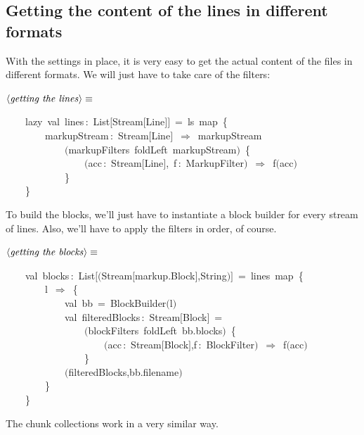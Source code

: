 \documentclass[a4paper,12pt]{article}
\begin{document}
\subsection{Getting the content of the lines in different formats}
With the settings in place, it is very easy to get the actual content
of the files in different formats. We will just have to take care of the
filters:

$\left<\mbox{\emph{getting the lines}}\right>\equiv$
\begin{program}~~~~{\vem lazy}~{\vem val}~lines\,{\rm :}~List$[$Stream$[$Line$]$$]$~=~ls~map~{\small\{}
\\~~~~~~~~markupStream\,{\rm :}~Stream$[$Line$]$~$\Rightarrow$~markupStream
\\~~~~~~~~~~~~$($markupFilters~foldLeft~markupStream$)$~{\small\{}
\\~~~~~~~~~~~~~~~~$($acc\,{\rm :}~Stream$[$Line$]$,~f\,{\rm :}~MarkupFilter$)$~$\Rightarrow$~f$($acc$)$
\\~~~~~~~~~~~~{\small\}}
\\~~~~{\small\}}
\\[0.5em]\end{program}
To build the blocks, we'll just have to instantiate a block builder
for every stream of lines. Also, we'll have to apply the filters in order,
of course.

$\left<\mbox{\emph{getting the blocks}}\right>\equiv$
\begin{program}~~~~{\vem val}~blocks\,{\rm :}~List$[$$($Stream$[$markup.Block$]$,String$)$$]$~=~lines~map~{\small\{}
\\~~~~~~~~l~$\Rightarrow$~{\small\{}
\\~~~~~~~~~~~~{\vem val}~bb~=~BlockBuilder$($l$)$
\\~~~~~~~~~~~~{\vem val}~filteredBlocks\,{\rm :}~Stream$[$Block$]$~=
\\~~~~~~~~~~~~~~~~$($blockFilters~foldLeft~bb.blocks$)$~{\small\{}
\\~~~~~~~~~~~~~~~~~~~~$($acc\,{\rm :}~Stream$[$Block$]$,f\,{\rm :}~BlockFilter$)$~$\Rightarrow$~f$($acc$)$
\\~~~~~~~~~~~~~~~~{\small\}}
\\~~~~~~~~~~~~$($filteredBlocks,bb.filename$)$
\\~~~~~~~~{\small\}}
\\~~~~{\small\}}
\\[0.5em]\end{program}
The chunk collections work in a very similar way.
\end{document}
